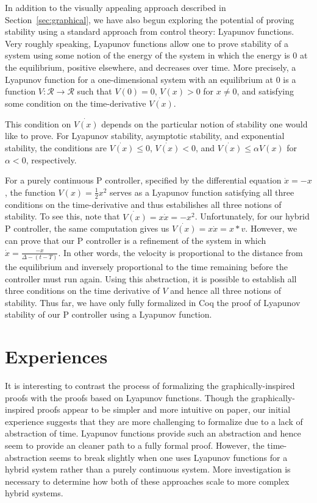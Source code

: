 \documentclass[preprint,nocopyrightspace]{sigplanconf}
\begin{document}
In addition to the visually appealing approach described in Section~\ref{sec:graphical}, we have also begun exploring the potential of proving stability using a standard approach from control theory: Lyapunov functions.
Very roughly speaking, Lyapunov functions allow one to prove stability of a system using some notion of the energy of the system in which the energy is 0 at the equilibrium, positive elsewhere, and decreases over time.
More precisely, a Lyapunov function for a one-dimensional system with an equilibrium at 0 is a function $V : \mathcal{R} \rightarrow \mathcal{R}$ such that $V(0) = 0$, $V(x) > 0$ for $x \neq 0$, and satisfying some condition on the time-derivative $\dot{V(x)}$.

This condition on $\dot{V(x)}$ depends on the particular notion of stability one would like to prove.
For Lyapunov stability, asymptotic stability, and exponential stability, the conditions are $\dot{V(x)} \leq 0$, $\dot{V(x)} < 0$, and $\dot{V(x)} \leq \alpha V(x)$ for $\alpha < 0$, respectively.

For a purely continuous P controller, specified by the differential equation $\dot{x} = -x$, the function $V(x) = \frac{1}{2}x^2$ serves as a Lyapunov function satisfying all three conditions on the time-derivative and thus estabilishes all three notions of stability.
To see this, note that $\dot{V(x)} = x\dot{x} = -x^2$.
Unfortunately, for our hybrid P controller, the same computation gives us $\dot{V(x)} = x\dot{x} = x*v$.
However, we can prove that our P controller is a refinement of the system in which $\dot{x} = \frac{-x}{\Delta - (t - T)}$.
In other words, the velocity is proportional to the distance from the equilibrium and inversely proportional to the time remaining before the controller must run again.
Using this abstraction, it is possible to establish all three conditions on the time derivative of $V$ and hence all three notions of stability.
Thus far, we have only fully formalized in Coq the proof of Lyapunov stability of our P controller using a Lyapunov function.

\section {Experiences}

It is interesting to contrast the process of formalizing the graphically-inspired proofs with the proofs based on Lyapunov functions.
Though the graphically-inspired proofs appear to be simpler and more intuitive on paper, our initial experience suggests that they are more challenging to formalize due to a lack of abstraction of time.
Lyapunov functions provide such an abstraction and hence seem to provide an cleaner path to a fully formal proof.
However, the time-abstraction seems to break slightly when one uses Lyapunov functions for a hybrid system rather than a purely continuous system.
More investigation is necessary to determine how both of these approaches scale to more complex hybrid systems.
\end{document}
